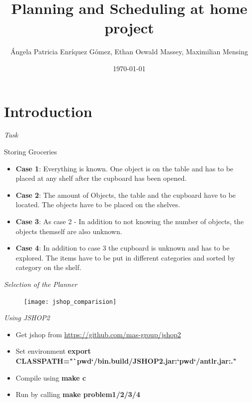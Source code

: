 \documentclass{beamer}
\title{Planning and Scheduling at home project}
\date{\today}
\author{\'{A}ngela Patricia Enr\'{i}quez G\'{o}mez, Ethan Oswald Massey, Maximilian Mensing}
\institute{BRSU}
\begin{document}
\maketitle


\section{Introduction}

\begin{frame}{\textsl{ Task }}

  Storing Groceries

  \begin{itemize}
    \item \textbf{Case 1}: Everything is known. One object is on the table and has to be placed at any shelf after the cupboard has been opened.
    \item \textbf{Case 2}: The amount of Objects, the table and the cupboard have to be located. The objects have to be placed on the shelves.
    \item \textbf{Case 3}: As case 2 - In addition to not knowing the number of objects, the objects themself are also unknown.
    \item \textbf{Case 4}: In addition to case 3 the cupboard is unknown and has to be explored. The items have to be put in different categories and sorted by category on the shelf.
  \end{itemize}

\end{frame}

\begin{frame}{\textsl{Selection of the Planner}}

  \begin{figure}
    \centering
    \texttt{[image: jshop\_comparision]}
    \label{fig:kim}
  \end{figure}

\end{frame}


\begin{frame}{\textsl{Using JSHOP2}}
  \begin{itemize}
    \item Get jshop from \url{https://github.com/mas-group/jshop2}
    \item Set environment \textbf{{\tiny export CLASSPATH="`pwd`/bin.build/JSHOP2.jar:`pwd`/antlr.jar:."}}
    \item Compile using \textbf{{\tiny make c}}
    \item Run by calling \textbf{{\tiny make problem1/2/3/4}}
  \end{itemize}

\end{frame}
\end{document}
